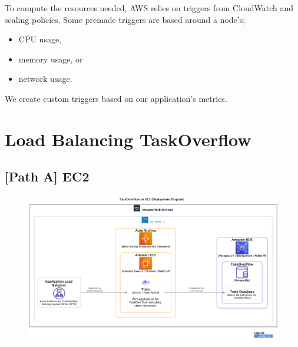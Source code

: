 \documentclass{csse4400}
\begin{document}
To compute the resources needed, AWS relies on triggers from CloudWatch and scaling policies.
Some premade triggers are based around a node's;

\begin{itemize}
    \item CPU usage,
    \item memory usage, or 
    \item network usage.
\end{itemize}

We create custom triggers based on our application's metrics.

\section{Load Balancing TaskOverflow}

\subsection{[Path A] EC2}

\begin{figure}[H]
  \includegraphics[width=\textwidth]{diagrams/ec2deployment}
\end{figure}

\end{document}
